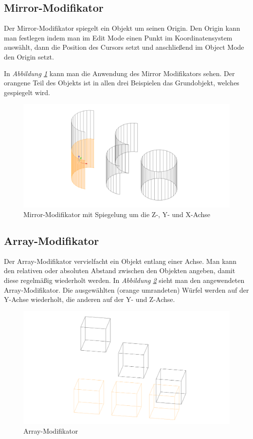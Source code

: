 \subsection{Mirror-Modifikator}
\label{Mirror:heading}
Der Mirror-Modifikator spiegelt ein Objekt um seinen Origin.\citep{blender:mirror_modifier}
Den Origin kann man festlegen indem man im Edit Mode einen Punkt im Koordinatensystem auswählt, dann die Position des Cursors setzt
und anschließend im Object Mode den Origin setzt.

In \textit{Abbildung \ref{modifikatoren:image2}} kann man die Anwendung des Mirror Modifikators sehen. Der orangene Teil des Objekts ist in allen drei Beispielen das
Grundobjekt, welches gespiegelt wird.

\begin{figure}[h]
    \centering
    \includegraphics[width=.8\textwidth]{images/Modifikatoren-Mirror.png}
    \caption{Mirror-Modifikator mit Spiegelung um die Z-, Y- und X-Achse}
    \label{modifikatoren:image2}
\end{figure}

\subsection{Array-Modifikator}
\label{Array:heading}
Der Array-Modifikator vervielfacht ein Objekt entlang einer Achse. Man kann den relativen oder absoluten Abstand zwischen den Objekten
angeben, damit diese regelmäßig wiederholt werden.\citep{blender:array_modifier} In \textit{Abbildung \ref{modifikatoren:image3}} sieht man den angewendeten Array-Modifikator.
Die ausgewählten (orange umrandeten) Würfel werden auf der Y-Achse
wiederholt, die anderen auf der Y- und Z-Achse.
\begin{figure}[h]
    \centering
    \includegraphics[width=.8\textwidth]{images/Modifikatoren-Array.png}
    \caption{Array-Modifikator}
    \label{modifikatoren:image3}
\end{figure}

